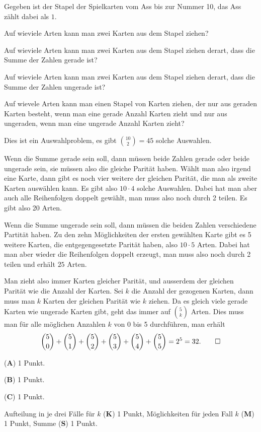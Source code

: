 Gegeben ist der Stapel der Spielkarten vom Ass bis zur Nummer 10,
das Ass zählt dabei als $1$.
\begin{center}
\end{center}

\begin{teilaufgaben}
\item 
Auf wieviele Arten kann man zwei Karten aus dem Stapel ziehen?
\item
Auf wieviele Arten kann man zwei Karten aus dem Stapel ziehen derart,
dass die Summe der Zahlen gerade ist?
\item
Auf wieviele Arten kann man zwei Karten aus dem Stapel ziehen derart,
dass die Summe der Zahlen ungerade ist?
\item
Auf wievele Arten kann man einen Stapel von Karten ziehen, der
nur aus geraden Karten besteht, wenn man eine gerade Anzahl Karten
zieht und nur aus ungeraden, wenn man eine ungerade Anzahl Karten zieht?
\end{teilaufgaben}

\begin{loesung}
\begin{teilaufgaben}
\item
Dies ist ein Auswahlproblem, es gibt $\binom{10}{2}=45$ solche Auswahlen.
\item
Wenn die Summe gerade sein soll, dann müssen beide Zahlen gerade oder beide
ungerade sein, sie müssen also die gleiche Parität haben.
Wählt man also irgend eine Karte, dann gibt es noch vier weitere der gleichen
Parität, die man als zweite Karten auswählen kann.
Es gibt also $10\cdot 4$ solche Auswahlen.
Dabei hat man aber auch alle Reihenfolgen doppelt gewählt, man muss also
noch durch 2 teilen.
Es gibt also 20 Arten.
\item
Wenn die Summe ungerade sein soll, dann müssen die beiden Zahlen verschiedene
Partität haben.
Zu den zehn Möglichkeiten der ersten gewählten Karte gibt es 5 weitere
Karten, die entgegengesetzte Parität haben, also $10\cdot 5$ Arten.
Dabei hat man aber wieder die Reihenfolgen doppelt erzeugt, man muss
also noch durch 2 teilen und erhält $25$ Arten.
\item
Man zieht also immer Karten gleicher Parität, und ausserdem der gleichen
Parität wie die Anzahl der Karten.
Sei $k$ die Anzahl der gezogenen Karten, dann muss man $k$ Karten der gleichen
Parität wie $k$ ziehen.
Da es gleich viele gerade Karten  wie ungerade Karten gibt, geht das immer
auf $\binom{5}{k}$ Arten.
Dies muss man für alle möglichen Anzahlen $k$ von 0 bis 5 durchführen, man
erhält
\[
\binom{5}{0}
+
\binom{5}{1}
+
\binom{5}{2}
+
\binom{5}{3}
+
\binom{5}{4}
+
\binom{5}{5}
=
2^5
=
32.
\qedhere
\]
\end{teilaufgaben}
\end{loesung}

\begin{bewertung}
\begin{teilaufgaben}
\item ({\bf A}) 1 Punkt.
\item ({\bf B}) 1 Punkt.
\item ({\bf C}) 1 Punkt.
\item Aufteilung in je drei Fälle für $k$ ({\bf K}) 1 Punkt,
Möglichkeiten für jeden Fall $k$ ({\bf M}) 1 Punkt,
Summe ({\bf S}) 1 Punkt.
\end{teilaufgaben}
\end{bewertung}

